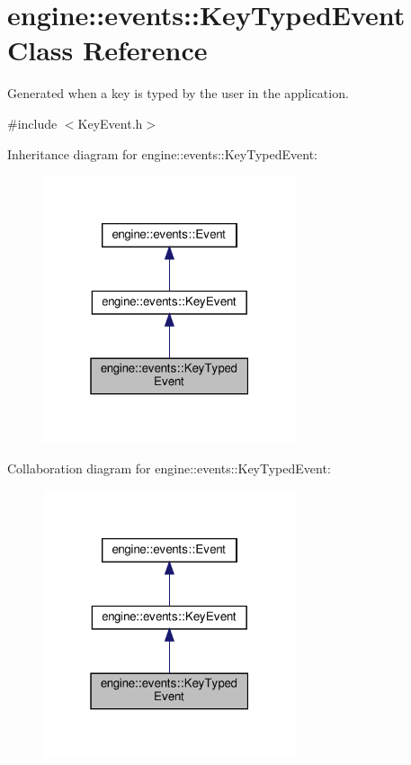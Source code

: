 \hypertarget{classengine_1_1events_1_1KeyTypedEvent}{}\section{engine\+:\+:events\+:\+:Key\+Typed\+Event Class Reference}
\label{classengine_1_1events_1_1KeyTypedEvent}


Generated when a key is typed by the user in the application.  




{\ttfamily \#include $<$Key\+Event.\+h$>$}



Inheritance diagram for engine\+:\+:events\+:\+:Key\+Typed\+Event\+:
\nopagebreak
\begin{figure}[H]
\begin{center}
\leavevmode
\includegraphics[width=211pt]{classengine_1_1events_1_1KeyTypedEvent__inherit__graph}
\end{center}
\end{figure}


Collaboration diagram for engine\+:\+:events\+:\+:Key\+Typed\+Event\+:
\nopagebreak
\begin{figure}[H]
\begin{center}
\leavevmode
\includegraphics[width=211pt]{classengine_1_1events_1_1KeyTypedEvent__coll__graph}
\end{center}
\end{figure}
